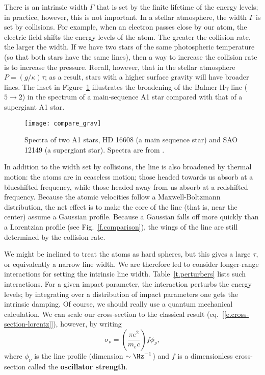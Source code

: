 There is an intrinsic width $\Gamma$ that is set by the finite lifetime of the energy levels; in practice, however, this is not important.  In a stellar atmosphere, the width $\Gamma$ is set by collisions.  For example, when an electron passes close by our atom, the electric field shifts the energy levels of the atom.  The greater the collision rate, the larger the width.
If we have two stars of the same photospheric temperature (so that both stars have the same lines), then a way to increase the collision rate is to increase the pressure. Recall, however, that in the stellar atmosphere $P = (g/\kappa)\tau$; as a result, stars with a higher surface gravity will have broader lines. The inset in Figure~\ref{f.compare_grav} illustrates the broadening of the Balmer H$\gamma$ line ($5\to 2$) in the spectrum of a main-sequence A1 star compared with that of a supergiant A1 star.

\begin{figure}[hp]
    \texttt{[image: compare\_grav]}
    \caption[Spectra of two A1 stars]{\label{f.compare_grav}
    Spectra of two A1 stars, HD 16608 (a main sequence star) and SAO 12149 (a supergiant star).  Spectra are from \citet{Jacoby1984A-library-of-st}.
    }
\end{figure}

In addition to the width set by collisions, the line is also broadened by thermal motion: the atoms are in ceaseless motion; those headed towards us absorb at a blueshifted frequency, while those headed away from us absorb at a redshifted frequency.  Because the atomic velocities follow a Maxwell-Boltzmann distribution, the net effect is to make the core of the line (that is, near the center) assume a Gaussian profile.  Because a Gaussian falls off more quickly than a Lorentzian profile (see Fig.~\ref{f.comparison}), the wings of the line are still determined by the collision rate.

We might be inclined to treat the atoms as hard spheres, but this gives a large $\tau$, or equivalently a narrow line width. We are therefore led to consider longer-range interactions for setting the intrinsic line width. Table~\ref{t.perturbers} lists such interactions. For a given impact parameter, the interaction perturbs the energy levels; by integrating over a distribution of  impact parameters one gets the intrinsic damping. Of course, we should really use a quantum mechanical calculation.  We can scale our cross-section to the classical result (eq.~[\ref{e.cross-section-lorentz}]), however, by writing
\begin{equation}\label{e.cross-section}
	 \sigma_{\nu} = \left(\frac{\pi e^{2}}{m_{e}c}\right) f \phi_{\nu}, 
\end{equation}
where $\phi_{\nu}$ is the line profile (dimension $\sim \Hz^{-1}$) and $f$ is a dimensionless cross-section called the \textbf{oscillator strength}.

